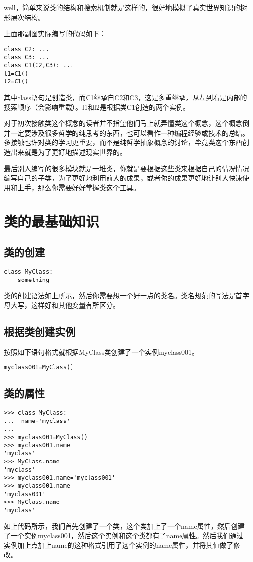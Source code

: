 \documentclass[12pt,oneside]{book}
\begin{document}
\begin{common-format}
well，简单来说类的结构和搜索机制就是这样的，很好地模拟了真实世界知识的树形层次结构。

上面那副图实际编写的代码如下：
\begin{Verbatim}
class C2: ...
class C3: ...
class C1(C2,C3): ...
l1=C1()
l2=C1()
\end{Verbatim}
其中class语句是创造类，而C1继承自C2和C3，这是多重继承，从左到右是内部的搜索顺序（会影响重载）。l1和l2是根据类C1创造的两个实例。

对于初次接触类这个概念的读者并不指望他们马上就弄懂类这个概念，这个概念倒并一定要涉及很多哲学的纯思考的东西，也可以看作一种编程经验或技术的总结。多接触也许对类的学习更重要，而不是纯哲学抽象概念的讨论，毕竟类这个东西创造出来就是为了更好地描述现实世界的。

最后别人编写的很多模块就是一堆类，你就是要根据这些类来根据自己的情况情况编写自己的子类，为了更好地利用前人的成果，或者你的成果更好地让别人快速使用和上手，那么你需要好好掌握类这个工具。

\section{类的最基础知识}
\subsection{类的创建}
\begin{Verbatim}
class MyClass:
    something
\end{Verbatim}
类的创建语法如上所示，然后你需要想一个好一点的类名。类名规范的写法是首字母大写，这样好和其他变量有所区分。

\subsection{根据类创建实例}
按照如下语句格式就根据MyClass类创建了一个实例myclass001。
\begin{Verbatim}
myclass001=MyClass()
\end{Verbatim}

\subsection{类的属性}
\begin{Verbatim}
>>> class MyClass:
...  name='myclass'
... 
>>> myclass001=MyClass()
>>> myclass001.name
'myclass'
>>> MyClass.name
'myclass'
>>> myclass001.name='myclass001'
>>> myclass001.name
'myclass001'
>>> MyClass.name
'myclass'
\end{Verbatim}
如上代码所示，我们首先创建了一个类，这个类加上了一个name属性，然后创建了一个实例myclass001，然后这个实例和这个类都有了name属性。然后我们通过实例加上点加上name的这种格式引用了这个实例的name属性，并将其值做了修改。


\end{common-format}
\end{document}
